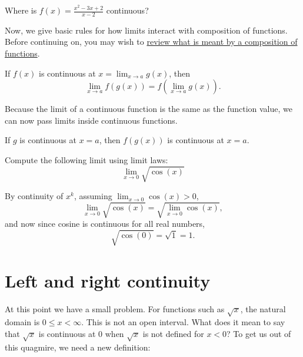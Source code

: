 \documentclass{ximera}
\begin{document}
\begin{question}
  Where is $f(x) = \frac{x^2-3x+2}{x-2}$ continuous?
  \begin{multipleChoice}
  \end{multipleChoice}
\end{question}


Now, we give basic rules for how limits interact with composition
of functions.  Before continuing on, you may wish to \href{https://ximera.osu.edu/math160fa17/m160prerequisites/PreRequisiteXards/U1Functions/1.3CompositionOfFunctions/titlePage}{review what is meant by a composition of functions}.  

\begin{theorem}
  If $f(x)$ is continuous at $x = \displaystyle\lim_{x\to a} g(x)$, then
  \[
  \displaystyle\lim_{x\to a} f(g(x)) = f(\displaystyle\lim_{x\to a} g(x)).
  \]
\end{theorem}

Because the limit of a continuous function is the same as the function
value, we can now pass limits inside continuous functions.

\begin{corollary}
If $g$ is continuous at $x=a$, then $f(g(x))$ is continuous at $x=a$.
\end{corollary}

\begin{example}
  Compute the following limit using limit laws:
  \[
  \displaystyle\lim_{x \to 0} \sqrt{\cos(x)}
  \]
  \begin{explanation}
    By continuity of $x^k$, assuming $\displaystyle\lim_{x \to 0} \cos(x) >0$,
    \[
    \displaystyle\lim_{x \to 0} \sqrt{\cos(x)} = \sqrt{\displaystyle\lim_{x \to 0} \cos(x)},
    \]
    and now since cosine is continuous for all real numbers,
    \[
    \sqrt{\cos(0)} = \sqrt{1} = 1.
    \]
  \end{explanation}
\end{example}

\section{Left and right continuity}


At this point we have a small problem.  For functions such as
$\sqrt{x}$, the natural domain is $0\leq x <\infty$.  This is not an
open interval.  What does it mean to say that $\sqrt{x}$ is continuous
at $0$ when $\sqrt{x}$ is not defined for $x<0$? To get us out of this
quagmire, we need a new definition:
\end{document}
